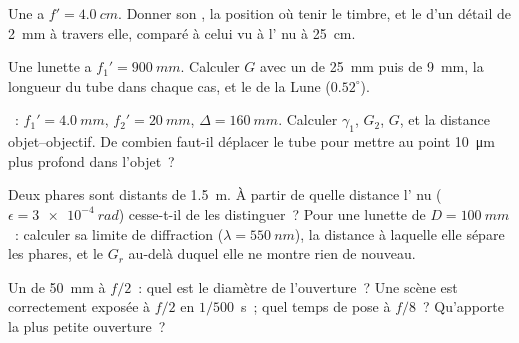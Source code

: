 \begin{exercise}[$\star$]\label{exo:b1:optical-instruments:3}
Une  a $f' = \qty{4.0}{cm}$. Donner son , la position
où tenir le timbre, et le  d'un détail de \qty{2}{mm}
à travers elle, comparé à celui vu à l' nu à \qty{25}{cm}.
\end{exercise}

\begin{exercise}[$\star$]\label{exo:b1:optical-instruments:4}
Une lunette a $f_1' = \qty{900}{mm}$. Calculer $G$ avec un  de
\qty{25}{mm} puis de \qty{9}{mm}, la longueur du tube dans chaque cas,
et le  de la Lune ($0.52^\circ$).
\end{exercise}

\begin{exercise}[$\star\star$]\label{exo:b1:optical-instruments:5}
~: $f_1' = \qty{4.0}{mm}$, $f_2' = \qty{20}{mm}$,
$\Delta = \qty{160}{mm}$. Calculer $\gamma_1$, $G_2$, $G$, et la distance
objet--objectif. De combien faut-il déplacer le tube pour mettre au point
\qty{10}{\micro m} plus profond dans l'objet~?
\end{exercise}

\begin{exercise}[$\star\star$]\label{exo:b1:optical-instruments:6}
Deux phares sont distants de \qty{1.5}{m}. À partir de quelle distance
l' nu ($\epsilon = \qty{3e-4}{rad}$) cesse-t-il de les distinguer~?
Pour une lunette de $D = \qty{100}{mm}$~: calculer sa limite de
diffraction ($\lambda =
\qty{550}{nm}$), la distance à laquelle elle sépare les phares, et le
 $G_r$ au-delà duquel elle ne montre rien de nouveau.
\end{exercise}

\begin{exercise}[$\star\star$]\label{exo:b1:optical-instruments:7}
Un  de \qty{50}{mm} à $f/2$~: quel est le diamètre de
l'ouverture~? Une scène est correctement exposée à $f/2$ en
$1/500$~\unit{s}~; quel temps de pose à $f/8$~? Qu'apporte la plus
petite ouverture~?
\end{exercise}

